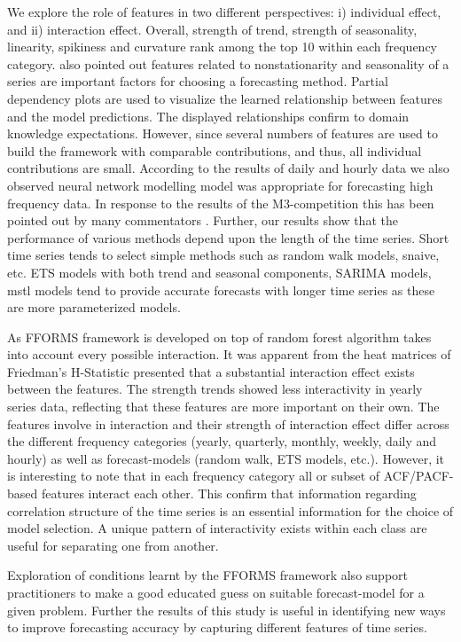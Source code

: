 \documentclass[11pt,a4paper,]{article}
\begin{document}
We explore the role of features in two different perspectives: i)
individual effect, and ii) interaction effect. Overall, strength of
trend, strength of seasonality, linearity, spikiness and curvature rank
among the top 10 within each frequency category.
\textcite{lemke2010meta} also pointed out features related to
nonstationarity and seasonality of a series are important factors for
choosing a forecasting method. Partial dependency plots are used to
visualize the learned relationship between features and the model
predictions. The displayed relationships confirm to domain knowledge
expectations. However, since several numbers of features are used to
build the framework with comparable contributions, and thus, all
individual contributions are small. According to the results of daily
and hourly data we also observed neural network modelling model was
appropriate for forecasting high frequency data. In response to the
results of the M3-competition this has been pointed out by many
commentators \autocite{makridakis2000m3}. Further, our results show that
the performance of various methods depend upon the length of the time
series. Short time series tends to select simple methods such as random
walk models, snaive, etc. ETS models with both trend and seasonal
components, SARIMA models, mstl models tend to provide accurate
forecasts with longer time series as these are more parameterized
models.

As FFORMS framework is developed on top of random forest algorithm takes
into account every possible interaction. It was apparent from the heat
matrices of Friedman's H-Statistic presented that a substantial
interaction effect exists between the features. The strength trends
showed less interactivity in yearly series data, reflecting that these
features are more important on their own. The features involve in
interaction and their strength of interaction effect differ across the
different frequency categories (yearly, quarterly, monthly, weekly,
daily and hourly) as well as forecast-models (random walk, ETS models,
etc.). However, it is interesting to note that in each frequency
category all or subset of ACF/PACF-based features interact each other.
This confirm that information regarding correlation structure of the
time series is an essential information for the choice of model
selection. A unique pattern of interactivity exists within each class
are useful for separating one from another.

Exploration of conditions learnt by the FFORMS framework also support
practitioners to make a good educated guess on suitable forecast-model
for a given problem. Further the results of this study is useful in
identifying new ways to improve forecasting accuracy by capturing
different features of time series.

\printbibliography[title=References]
\end{document}
